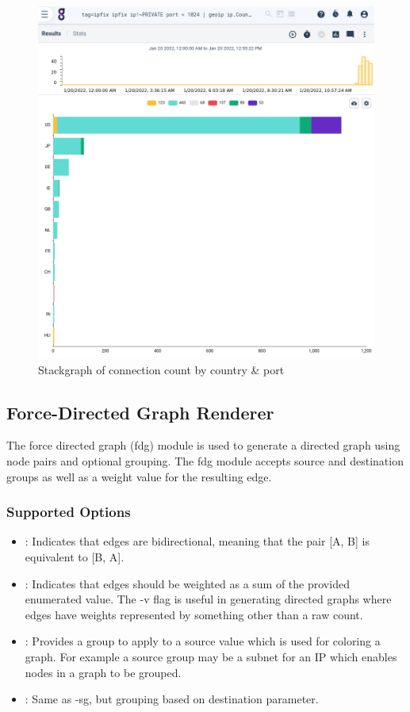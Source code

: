 \begin{figure}[H]
	\includegraphics[width=0.6\linewidth]{images/stackgraph-connections.png}
	\caption{Stackgraph of connection count by country \& port}
	\label{fig:stackgraph-connections}
\end{figure}



\subsection{Force-Directed Graph Renderer}

The force directed graph (fdg) module is used to generate a directed
graph using node pairs and optional grouping. The fdg module accepts
source and destination groups as well as a weight value for the
resulting edge.

\subsubsection{Supported Options}

\begin{itemize}
\item
  : Indicates that edges are bidirectional, meaning that the pair
  [A, B] is equivalent to [B, A].
\item
  : Indicates that edges
  should be weighted as a sum of the provided enumerated value. The -v
  flag is useful in generating directed graphs where edges have weights
  represented by something other than a raw count.
\item
  : Provides a group to
  apply to a source value which is used for coloring a graph. For
  example a source group may be a subnet for an IP which enables nodes
  in a graph to be grouped.
\item
  : Same as -sg, but
  grouping based on destination parameter.
\end{itemize}

